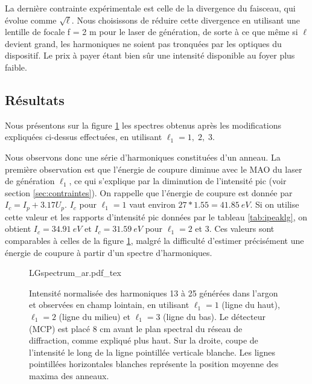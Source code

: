 La dernière contrainte expérimentale est celle de la divergence du faisceau, qui évolue comme $\sqrt{\ell}$. Nous choisissons de réduire cette divergence en utilisant une lentille de focale f = 2 m pour le laser de génération, de sorte à ce que même si $\ell$ devient grand, les harmoniques ne soient pas tronquées par les optiques du dispositif. Le prix à payer étant bien sûr une intensité disponible au foyer plus faible. 

\subsection{Résultats}
\label{sec:results_lg}
Nous présentons sur la figure \ref{Fig:LGSpectrumAr} les spectres obtenus après les modifications expliquées ci-dessus effectuées, en utilisant $\ell_{1} = 1,\;2,\;3$. 

Nous observons donc une série d'harmoniques constituées d'un anneau. La première observation est que l'énergie de coupure diminue avec le MAO du laser de génération $\ell_{1}$, ce qui s'explique par la diminution de l'intensité pic (voir section \ref{sec:contraintes}). On rappelle que l'énergie de coupure est donnée par $I_c = I_p+3.17U_p$. $I_c$ pour $\ell_{1} = 1$ vaut environ $27*1.55=\SI{41.85}{eV}$. Si on utilise cette valeur et les rapports d'intensité pic données par le tableau \ref{tab:ipeaklg}, on obtient $I_c=\SI{34.91}{eV}$ et $I_c=\SI{31.59}{eV}$ pour $\ell_{1} = 2$ et 3. Ces valeurs sont comparables à celles de la figure \ref{Fig:LGSpectrumAr}, malgré la difficulté d'estimer précisément une énergie de coupure à partir d'un spectre d'harmoniques. 

\begin{figure}[!ht]
\centering
\def\svgwidth{1\columnwidth}
{LGspectrum_ar.pdf_tex}
\caption{Intensité normalisée des harmoniques 13 à 25 générées dans l'argon et observées en champ lointain, en utilisant $\ell_{1} = 1$ (ligne du haut), $\ell_{1} = 2$ (ligne du milieu) et $\ell_{1} = 3$ (ligne du bas). Le détecteur (MCP) est placé 8 cm avant le plan spectral du réseau de diffraction, comme expliqué plus haut. Sur la droite, coupe de l'intensité le long de la ligne pointillée verticale blanche. Les lignes pointillées horizontales blanches représente la position moyenne des maxima des anneaux.}
\label{Fig:LGSpectrumAr}
\end{figure}

